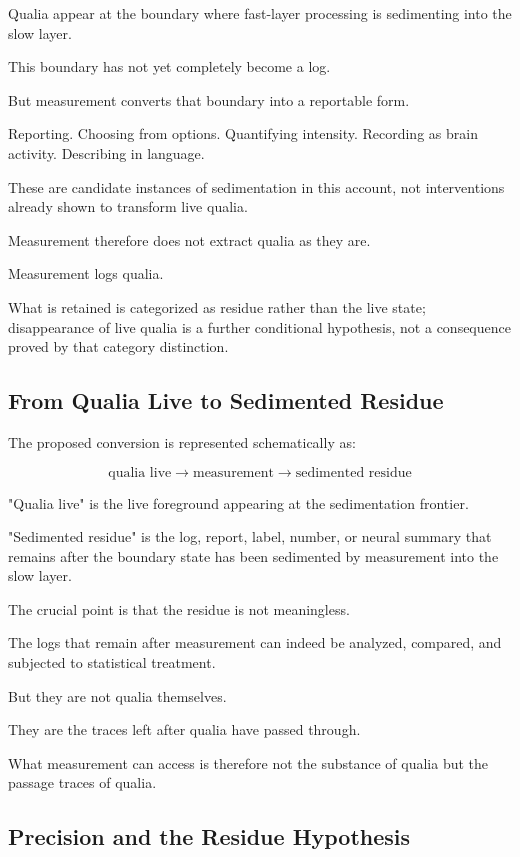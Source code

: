 Qualia appear at the boundary where fast-layer processing is sedimenting into the slow layer.

This boundary has not yet completely become a log.

But measurement converts that boundary into a reportable form.

Reporting. Choosing from options. Quantifying intensity. Recording as brain activity. Describing in language.

These are candidate instances of sedimentation in this account, not interventions already shown to transform live qualia.

Measurement therefore does not extract qualia as they are.

Measurement logs qualia.

What is retained is categorized as residue rather than the live state; disappearance of live qualia is a further conditional hypothesis, not a consequence proved by that category distinction.

\subsection{From Qualia Live to Sedimented Residue}


The proposed conversion is represented schematically as:

\begin{equation}
\text{qualia live} \rightarrow \text{measurement} \rightarrow \text{sedimented residue}
\end{equation}

"Qualia live" is the live foreground appearing at the sedimentation frontier.

"Sedimented residue" is the log, report, label, number, or neural summary that remains after the boundary state has been sedimented by measurement into the slow layer.

The crucial point is that the residue is not meaningless.

The logs that remain after measurement can indeed be analyzed, compared, and subjected to statistical treatment.

But they are not qualia themselves.

They are the traces left after qualia have passed through.

What measurement can access is therefore not the substance of qualia but the passage traces of qualia.

\subsection{Precision and the Residue Hypothesis}


